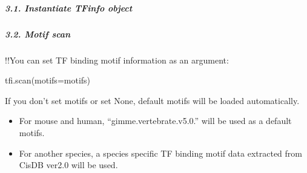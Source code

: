 \documentclass[letterpaper,10pt,english]{sphinxmanual}
\begin{document}
\subparagraph{3.1. Instantiate TFinfo object}
\label{\detokenize{notebooks/02_motif_scan/02_atac_peaks_to_TFinfo_with_celloracle_20200801:3.1.-Instantiate-TFinfo-object}}
{
\begin{sphinxVerbatim}[commandchars=\\\{\}]
\llap{\color{nbsphinxin}[16]:\,\hspace{\fboxrule}\hspace{\fboxsep}}
   
\end{sphinxVerbatim}
}


\subparagraph{3.2. Motif scan}
\label{\detokenize{notebooks/02_motif_scan/02_atac_peaks_to_TFinfo_with_celloracle_20200801:3.2.-Motif-scan}}
!!You can set TF binding motif information as an argument:

tfi.scan(motifs=motifs)

If you don’t set motifs or set None, default motifs will be loaded automatically.
\begin{itemize}
\item {} 
For mouse and human, “gimme.vertebrate.v5.0.” will be used as a default motifs.

\item {} 
For another species, a species specific TF binding motif data extracted from CisDB ver2.0 will be used.

\end{itemize}

{
\begin{sphinxVerbatim}[commandchars=\\\{\}]
\llap{\color{nbsphinxin}[ ]:\,\hspace{\fboxrule}\hspace{\fboxsep}}
              

\end{sphinxVerbatim}
}
\end{document}
